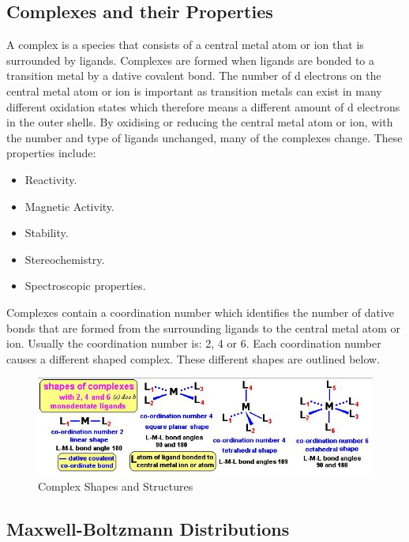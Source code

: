 	\subsection{Complexes and their Properties}

A complex is a species that consists of a central metal atom or ion that is surrounded by ligands. Complexes are formed when ligands are bonded to a transition metal by a dative covalent bond. The number of d electrons on the central metal atom or ion is important as transition metals can exist in many different oxidation states which therefore means a different amount of d electrons in the outer shells.  By oxidising or reducing the central metal atom or ion, with the number and type of ligands unchanged, many of the complexes change. These properties include:

\begin{itemize}
\item Reactivity.
\item Magnetic Activity.
\item Stability.
\item Stereochemistry.
\item Spectroscopic properties.
\end{itemize}

Complexes contain a coordination number which identifies the number of dative bonds that are formed from the surrounding ligands to the central metal atom or ion. Usually the coordination number is: 2, 4 or 6. Each coordination number causes a different shaped complex. These different shapes are outlined below.

\begin{figure}[H]
    \includegraphics[width=\textwidth]{./Planning/Images/ComplexShapes.jpg}
    \caption{Complex Shapes and Structures} \label{fig:Complex Shapes}
\end{figure}


\subsection {Maxwell-Boltzmann Distributions} \label{MaxwellDistribution}

